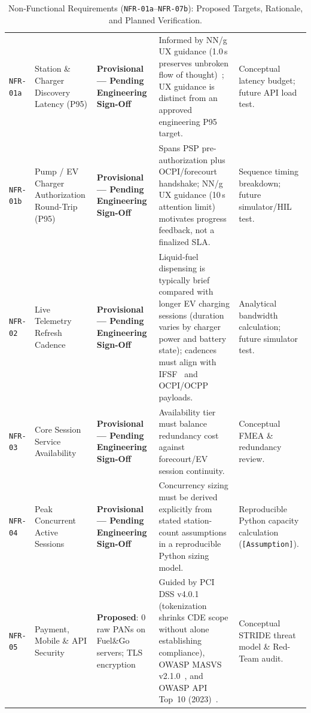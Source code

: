\begin{table}[htbp]
  \centering
  \caption{Non-Functional Requirements (\texttt{NFR-01a}--\texttt{NFR-07b}): Proposed Targets, Rationale, and Planned Verification.}
  \label{tab:nfr-matrix}
  \small
  \begin{tabularx}{\linewidth}{@{}P{17mm} P{26mm} P{27mm} L P{27mm}@{}}
    \toprule
     &  &  &  &  \\
    \midrule
    \texttt{NFR-01a} & Station \& Charger Discovery Latency (P95) & \textbf{Provisional --- Pending Engineering Sign-Off} & Informed by NN/g UX guidance (1.0\,s preserves unbroken flow of thought)~\cite{nielsen1993responsetimes}; UX guidance is distinct from an approved engineering P95 target. & Conceptual latency budget; future API load test. \\
    \texttt{NFR-01b} & Pump / EV Charger Authorization Round-Trip (P95) & \textbf{Provisional --- Pending Engineering Sign-Off} & Spans PSP pre-authorization plus OCPI/forecourt handshake; NN/g UX guidance (10\,s attention limit)~\cite{nielsen1993responsetimes} motivates progress feedback, not a finalized SLA. & Sequence timing breakdown; future simulator/HIL test. \\
    \texttt{NFR-02} & Live Telemetry Refresh Cadence & \textbf{Provisional --- Pending Engineering Sign-Off} & Liquid-fuel dispensing is typically brief compared with longer EV charging sessions (duration varies by charger power and battery state); cadences must align with IFSF~\cite{ifsf_specs} and OCPI/OCPP~\cite{evroaming2025ocpi,oca2020ocpp201} payloads. & Analytical bandwidth calculation; future simulator test. \\
    \texttt{NFR-03} & Core Session Service Availability & \textbf{Provisional --- Pending Engineering Sign-Off} & Availability tier must balance redundancy cost against forecourt/EV session continuity. & Conceptual FMEA \& redundancy review. \\
    \texttt{NFR-04} & Peak Concurrent Active Sessions & \textbf{Provisional --- Pending Engineering Sign-Off} & Concurrency sizing must be derived explicitly from stated station-count assumptions in a reproducible Python sizing model. & Reproducible Python capacity calculation (\texttt{[Assumption]}). \\
    \texttt{NFR-05} & Payment, Mobile \& API Security & \textbf{Proposed}: 0 raw PANs on Fuel\&Go servers; TLS encryption & Guided by PCI DSS v4.0.1~\cite{pcissc2024pcidss401} (tokenization shrinks CDE scope without alone establishing compliance), OWASP MASVS v2.1.0~\cite{owasp2024masvs}, and OWASP API Top~10 (2023)~\cite{owasp2023apitop10}. & Conceptual STRIDE threat model \& Red-Team audit. \\

\end{tabularx}
\end{table}
